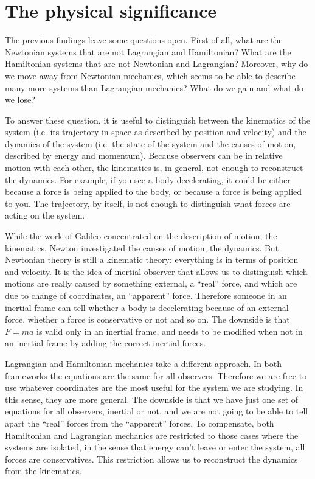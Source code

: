 \documentclass[11pt]{article}
\begin{document}
\section{The physical significance}

The previous findings leave some questions open. First of all, what are the Newtonian systems that are not Lagrangian and Hamiltonian? What are the Hamiltonian systems that are not Newtonian and Lagrangian? Moreover, why do we move away from Newtonian mechanics, which seems to be able to describe many more systems than Lagrangian mechanics? What do we gain and what do we lose?

To answer these question, it is useful to distinguish between the kinematics of the system (i.e. its trajectory in space as described by position and velocity) and the dynamics of the system (i.e. the state of the system and the causes of motion, described by energy and momentum). Because observers can be in relative motion with each other, the kinematics is, in general, not enough to reconstruct the dynamics. For example, if you see a body decelerating, it could be either because a force is being applied to the body, or because a force is being applied to you. The trajectory, by itself, is not enough to distinguish what forces are acting on the system.

While the work of Galileo concentrated on the description of motion, the kinematics, Newton investigated the causes of motion, the dynamics. But Newtonian theory is still a kinematic theory: everything is in terms of position and velocity. It is the idea of inertial observer that allows us to distinguish which motions are really caused by something external, a ``real'' force, and which are due to change of coordinates, an ``apparent'' force. Therefore someone in an inertial frame can tell whether a body is decelerating because of an external force, whether a force is conservative or not and so on. The downside is that $F=ma$ is valid only in an inertial frame, and needs to be modified when not in an inertial frame by adding the correct inertial forces. 

Lagrangian and Hamiltonian mechanics take a different approach. In both frameworks the equations are the same for all observers. Therefore we are free to use whatever coordinates are the most useful for the system we are studying. In this sense, they are more general. The downside is that we have just one set of equations for all observers, inertial or not, and we are not going to be able to tell apart the ``real'' forces from the ``apparent'' forces. To compensate, both Hamiltonian and Lagrangian mechanics are restricted to those cases where the systems are isolated, in the sense that energy can't leave or enter the system, all forces are conservatives. This restriction allows us to reconstruct the dynamics from the kinematics.
\end{document}
